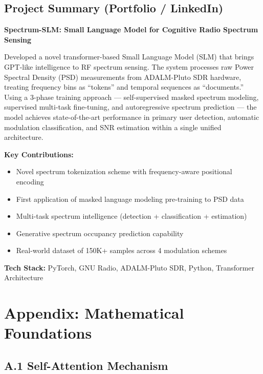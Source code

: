 \documentclass[12pt, a4paper]{article}
\newcommand{\cmark}{\textcolor{codegreen}{\ding{51}}}
\begin{document}
\subsection{Project Summary (Portfolio / LinkedIn)}

\begin{tipbox}
\textbf{Spectrum-SLM: Small Language Model for Cognitive Radio Spectrum Sensing}

Developed a novel transformer-based Small Language Model (SLM) that brings GPT-like intelligence to RF spectrum sensing. The system processes raw Power Spectral Density (PSD) measurements from ADALM-Pluto SDR hardware, treating frequency bins as ``tokens'' and temporal sequences as ``documents.'' Using a 3-phase training approach — self-supervised masked spectrum modeling, supervised multi-task fine-tuning, and autoregressive spectrum prediction — the model achieves state-of-the-art performance in primary user detection, automatic modulation classification, and SNR estimation within a single unified architecture.

\textbf{Key Contributions:}
\begin{itemize}[leftmargin=1.5em]
    \item[\cmark] Novel spectrum tokenization scheme with frequency-aware positional encoding
    \item[\cmark] First application of masked language modeling pre-training to PSD data
    \item[\cmark] Multi-task spectrum intelligence (detection + classification + estimation)
    \item[\cmark] Generative spectrum occupancy prediction capability
    \item[\cmark] Real-world dataset of 150K+ samples across 4 modulation schemes
\end{itemize}

\textbf{Tech Stack:} PyTorch, GNU Radio, ADALM-Pluto SDR, Python, Transformer Architecture
\end{tipbox}


\section*{Appendix: Mathematical Foundations}

\subsection*{A.1 Self-Attention Mechanism}
\end{document}
